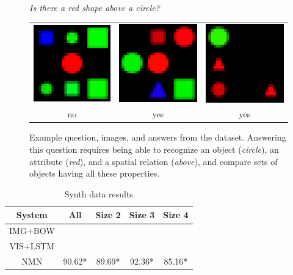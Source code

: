 \documentclass[10pt,twocolumn,letterpaper]{article}
\begin{document}
\begin{figure}
  \centering
  \emph{Is there a red shape above a circle?} \\[1em]
  \begin{tabular}{ccc}
    \includegraphics[width=0.25\columnwidth]{fig/shapes1_big} &
    \includegraphics[width=0.25\columnwidth]{fig/shapes2_big} &
    \includegraphics[width=0.25\columnwidth]{fig/shapes3_big} \\
    no & yes & yes
  \end{tabular}
  \caption{Example question, images, and answers from the \shapes dataset.
    Answering this question requires being able to recognize an object
    (\emph{circle}), an attribute (\emph{red}), and a spatial relation
    (\emph{above}), and compare sets of objects having all these properties.}
\end{figure}



\begin{table}
  \footnotesize
  \centering
  \begin{tabular}{ccccc}
    \toprule
    System & All & Size 2 & Size 3 & Size 4 \\
    \midrule
    IMG+BOW & \\
    VIS+LSTM &  \\
    NMN & 90.62* & 89.69* & 92.36* & 85.16* \\
    \bottomrule
  \end{tabular}
  \caption{Synth data results}
\end{table}
\end{document}
